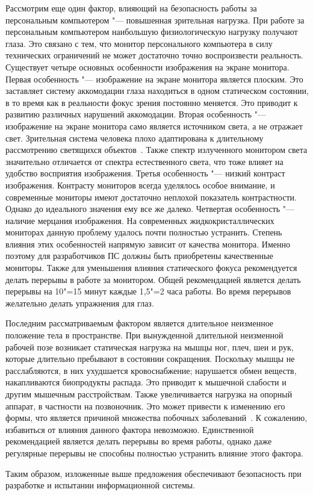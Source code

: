 Рассмотрим еще один фактор, влияющий на безопасность работы за персональным компьютером "--- повышенная зрительная нагрузка.
При работе за персональным компьютером наибольшую физиологическую нагрузку получают глаза.
Это связано с тем, что монитор персонального компьютера в силу технических ограничений не может достаточно точно воспроизвести реальность.
Существует четыре основных особенности изображения на экране монитора.
Первая особенность "--- изображение на экране монитора является плоским. Это заставляет систему аккомодации глаза находиться в одном статическом состоянии, в то время как в реальности фокус зрения постоянно меняется. Это приводит к развитию различных нарушений аккомодации.
Вторая особенность "--- изображение на экране монитора само является источником света, а не отражает свет. Зрительная система человека плохо адаптирована к длительному рассмотрению светящихся объектов~\cite{ot_long_work_pc}. Также спектр излученного монитором света значительно отличается от спектра естественного света, что тоже влияет на удобство восприятия изображения.
Третья особенность "--- низкий контраст изображения. Контрасту мониторов всегда уделялось особое внимание, и современные мониторы имеют достаточно неплохой показатель контрастности. Однако до идеального значения ему все же далеко.
Четвертая особенность "--- наличие мерцания изображения. На современных жидкокристаллических мониторах данную проблему удалось почти полностью устранить.
Степень влияния этих особенностей напрямую зависит от качества монитора. Именно поэтому для разработчиков ПС должны быть приобретены качественные мониторы.
Также для уменьшения влияния статического фокуса рекомендуется делать перерывы в работе за монитором.
Общей рекомендацией является делать перерывы на 10"=15 минут каждые 1,5"=2 часа работы.
Во время перерывов желательно делать упражнения для глаз.

Последним рассматриваемым фактором является длительное неизменное положение тела в пространстве.
При вынужденной длительной неизменной рабочей позе возникает статическая нагрузка на мышцы ног, плеч, шеи и рук, которые длительно пребывают в состоянии сокращения.
Поскольку мышцы не расслабляются, в них ухудшается кровоснабжение; нарушается обмен веществ, накапливаются биопродукты распада.
Это приводит к мышечной слабости и другим мышечным расстройствам.
Также увеличивается нагрузка на опорный аппарат, в частности на позвоночник. Это может привести к изменению его формы, что является причиной множества побочных заболеваний~\cite{ot_back_diseases}.
К сожалению, избавиться от влияния данного фактора невозможно.
Единственной рекомендацией является делать перерывы во время работы, однако даже регулярные перерывы не способны полностью устранить влияние этого фактора.

Таким образом, изложенные выше предложения обеспечивают безопасность при разработке и испытании информационной системы.
